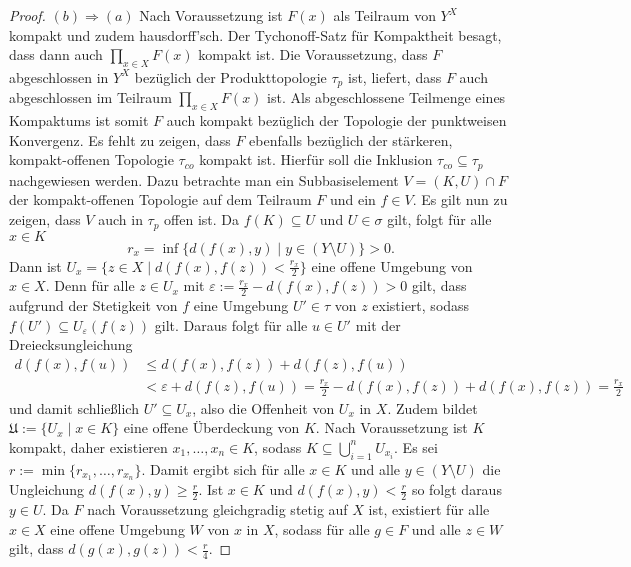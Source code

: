 \begin{proof}
  $(b) \Rightarrow (a)$
  Nach Voraussetzung ist $F(x)$ als Teilraum von $Y^X$ kompakt und zudem hausdorff'sch.
  Der Tychonoff-Satz für Kompaktheit besagt, dass dann auch $\prod_{x \in X} F(x)$ kompakt ist.
  Die Voraussetzung, dass $F$ abgeschlossen in $Y^X$ bezüglich der Produkttopologie $\tau_p$ ist, liefert, dass $F$ auch abgeschlossen im Teilraum $\prod_{x \in X} F(x)$ ist.
  Als abgeschlossene Teilmenge eines Kompaktums ist somit $F$ auch kompakt bezüglich der Topologie der punktweisen Konvergenz.
  Es fehlt zu zeigen, dass $F$ ebenfalls bezüglich der stärkeren, kompakt-offenen Topologie $\tau_{co}$ kompakt ist.
  Hierfür soll die Inklusion $\tau_{co} \subseteq \tau_p$ nachgewiesen werden.
  Dazu betrachte man ein Subbasiselement $V = (K,U) \cap F$ der kompakt-offenen Topologie auf dem Teilraum $F$ und ein $f \in V$.
  Es gilt nun zu zeigen, dass $V$ auch in $\tau_p$ offen ist.
  Da $f(K) \subseteq U$ und $U \in \sigma$ gilt, folgt für alle $x \in K$
  \begin{displaymath}
    r_x = \inf\{d(f(x),y) \mid y \in (Y \setminus U) \} > 0.
  \end{displaymath}
  Dann ist $U_x = \{ z \in X \mid d(f(x),f(z)) < \tfrac{r_x}{2}\}$ eine offene Umgebung von $x \in X$.
  Denn für alle $z \in U_x$ mit $\varepsilon := \tfrac{r_x}{2} - d(f(x),f(z)) > 0$ gilt, dass aufgrund der Stetigkeit von $f$ eine Umgebung $U' \in \tau$ von $z$ existiert, sodass $f(U') \subseteq U_\varepsilon(f(z))$ gilt.
  Daraus folgt für alle $u \in U'$ mit der Dreiecksungleichung
  \begin{align*}
    d(f(x),f(u)) &\leq d(f(x),f(z)) + d(f(z),f(u)) \\
                 &< \varepsilon + d(f(z),f(u)) = \frac{r_x}{2} - d(f(x),f(z)) + d(f(x),f(z)) =  \frac{r_x}{2}
  \end{align*}
  und damit schließlich $U' \subseteq U_x$, also die Offenheit von $U_x$ in $X$.
  Zudem bildet $\mathfrak{U} := \{U_x \mid x \in K\}$ eine offene Überdeckung von $K$. 
  Nach Voraussetzung ist $K$ kompakt, daher existieren $x_1,\dots,x_n \in K$, sodass $K \subseteq \bigcup_{i=1}^n U_{x_i}$.
  Es sei $r:= \min\{r_{x_1},\dots,r_{x_n}\}$. 
  Damit ergibt sich für alle $x \in K$ und alle $y \in (Y \setminus U)$ die Ungleichung $d(f(x),y) \geq \tfrac{r}{2}$.
  Ist $x \in K$ und $d(f(x),y) < \tfrac{r}{2}$ so folgt daraus $y \in U$.
  Da $F$ nach Voraussetzung gleichgradig stetig auf $X$ ist, existiert für alle $x \in X$ eine offene Umgebung $W$ von $x$ in $X$, sodass für alle $g \in F$ und alle $z \in W$ gilt, dass $d(g(x),g(z)) < \tfrac{r}{4}$.

\end{proof}
